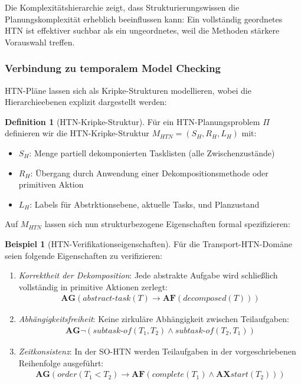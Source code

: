 ﻿\documentclass[a4paper,12pt]{article}
\theoremstyle{definition}
\newtheorem{definition}{Definition}[section]
\newtheorem{beispiel}{Beispiel}[section]
\begin{document}
Die Komplexitätshierarchie zeigt, dass Strukturierungswissen die Planungskomplexität erheblich beeinflussen kann: Ein vollständig geordnetes HTN ist effektiver suchbar als ein ungeordnetes, weil die Methoden stärkere Vorauswahl treffen.

\subsubsection{Verbindung zu temporalem Model Checking}

HTN-Pläne lassen sich als Kripke-Strukturen modellieren, wobei die Hierarchieebenen explizit dargestellt werden:

\begin{definition}[HTN-Kripke-Struktur]
Für ein HTN-Planungsproblem $\Pi$ definieren wir die HTN-Kripke-Struktur $M_{\mathit{HTN}} = (S_H, R_H, L_H)$ mit:
\begin{itemize}
  \item[-] $S_H$: Menge partiell
  dekomponierten Tasklisten (alle Zwischenzustände)
  \item[-] $R_H$: Übergang durch Anwendung einer Dekompositionsmethode oder primitiven Aktion
  \item[-] $L_H$: Labels für Abstrktionsebene, aktuelle Tasks, und Planzustand
\end{itemize}
\end{definition}

Auf $M_{\mathit{HTN}}$ lassen sich nun strukturbezogene Eigenschaften formal spezifizieren:

\begin{beispiel}[HTN-Verifikationseigenschaften]
Für die Transport-HTN-Domäne seien folgende Eigenschaften zu verifizieren:
\begin{enumerate}
  \item \textit{Korrektheit der Dekomposition}: Jede abstrakte Aufgabe wird schließlich vollständig in primitive Aktionen zerlegt:
  \begin{align}
    \mathbf{AG}(\mathit{abstract\text{-}task}(T) \to \mathbf{AF}(\mathit{decomposed}(T)))
  \end{align}
  \item \textit{Abhängigkeitsfreiheit}: Keine zirkuläre Abhängigkeit zwischen Teilaufgaben:
  \begin{align}
    \mathbf{AG}\neg(\mathit{subtask\text{-}of}(T_1, T_2) \land \mathit{subtask\text{-}of}(T_2, T_1))
  \end{align}
  \item \textit{Zeitkonsistenz}: In der SO-HTN werden Teilaufgaben in der vorgeschriebenen Reihenfolge ausgeführt:
  \begin{align}
    \mathbf{AG}(\mathit{order}(T_1 < T_2) \to \mathbf{AF}(\mathit{complete}(T_1) \land \mathbf{AX}\mathit{start}(T_2)))
  \end{align}
\end{enumerate}
\end{beispiel}
\end{document}
